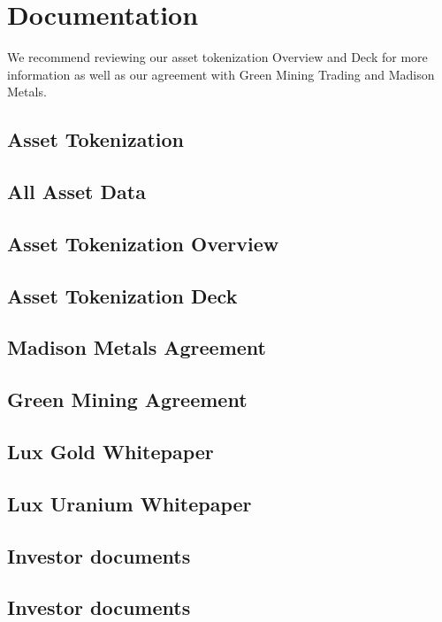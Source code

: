 \documentclass[11pt]{article}
\begin{document}
\section{Documentation}

We recommend reviewing our asset tokenization Overview and Deck for more information as well as our agreement with Green Mining Trading and Madison Metals.


\subsection{Asset Tokenization}

\subsection{All Asset Data}

\subsection{Asset Tokenization Overview}

\subsection{Asset Tokenization Deck}

\subsection{Madison Metals Agreement}

\subsection{Green Mining Agreement}

\subsection{Lux Gold Whitepaper}

\subsection{Lux Uranium Whitepaper}

\subsection{Investor documents}

\subsection{Investor documents}
\end{document}
